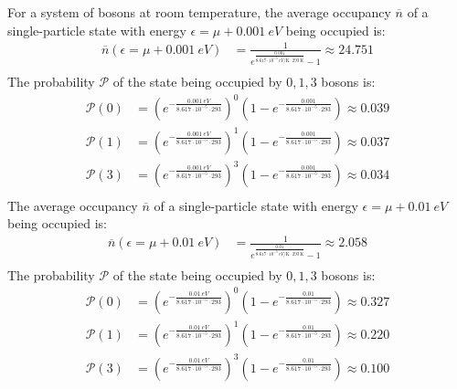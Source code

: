 \documentclass{article}
\begin{document}
For a system of bosons at room temperature, the average occupancy $\overline{n}$ of a single-particle state with energy $\epsilon = \mu + 0.001~\unit{eV}$ being occupied is:
\begin{equation}
    \begin{split}
        \overline{n}\left(\epsilon = \mu + 0.001~\unit{eV}\right) & = \frac{1}{e^{\frac{0.001}{8.617 \cdot 10^{-5}~\unit{eV\per\kelvin} \cdot 293~\unit{\kelvin}}} - 1} \approx 24.751 \\
    \end{split}
\end{equation}
The probability $\mathcal{P}$ of the state being occupied by $0, 1, 3$ bosons is:
\begin{equation}
    \begin{split}
        \mathcal{P}\left(0\right) & = {\left(e^{-\frac{0.001~\unit{eV}}{8.617 \cdot 10^{-5} \cdot 293}}\right)}^0\left(1 - e^{-\frac{0.001}{8.617 \cdot 10^{-5} \cdot 293}}\right) \approx 0.039 \\
        \mathcal{P}\left(1\right) & = {\left(e^{-\frac{0.001~\unit{eV}}{8.617 \cdot 10^{-5} \cdot 293}}\right)}^1\left(1 - e^{-\frac{0.001}{8.617 \cdot 10^{-5} \cdot 293}}\right) \approx 0.037 \\
        \mathcal{P}\left(3\right) & = {\left(e^{-\frac{0.001~\unit{eV}}{8.617 \cdot 10^{-5} \cdot 293}}\right)}^3\left(1 - e^{-\frac{0.001}{8.617 \cdot 10^{-5} \cdot 293}}\right) \approx 0.034 \\
    \end{split}
\end{equation}
The average occupancy $\overline{n}$ of a single-particle state with energy $\epsilon = \mu + 0.01~\unit{eV}$ being occupied is:
\begin{equation}
    \begin{split}
        \overline{n}\left(\epsilon = \mu + 0.01~\unit{eV}\right) & = \frac{1}{e^{\frac{0.01}{8.617 \cdot 10^{-5}~\unit{eV\per\kelvin} \cdot 293~\unit{\kelvin}}} - 1} \approx 2.058 \\
    \end{split}
\end{equation}
The probability $\mathcal{P}$ of the state being occupied by $0, 1, 3$ bosons is:
\begin{equation}
    \begin{split}
        \mathcal{P}\left(0\right) & = {\left(e^{-\frac{0.01~\unit{eV}}{8.617 \cdot 10^{-5} \cdot 293}}\right)}^0\left(1 - e^{-\frac{0.01}{8.617 \cdot 10^{-5} \cdot 293}}\right) \approx 0.327 \\
        \mathcal{P}\left(1\right) & = {\left(e^{-\frac{0.01~\unit{eV}}{8.617 \cdot 10^{-5} \cdot 293}}\right)}^1\left(1 - e^{-\frac{0.01}{8.617 \cdot 10^{-5} \cdot 293}}\right) \approx 0.220 \\
        \mathcal{P}\left(3\right) & = {\left(e^{-\frac{0.01~\unit{eV}}{8.617 \cdot 10^{-5} \cdot 293}}\right)}^3\left(1 - e^{-\frac{0.01}{8.617 \cdot 10^{-5} \cdot 293}}\right) \approx 0.100 \\
    \end{split}
\end{equation}
\end{document}
